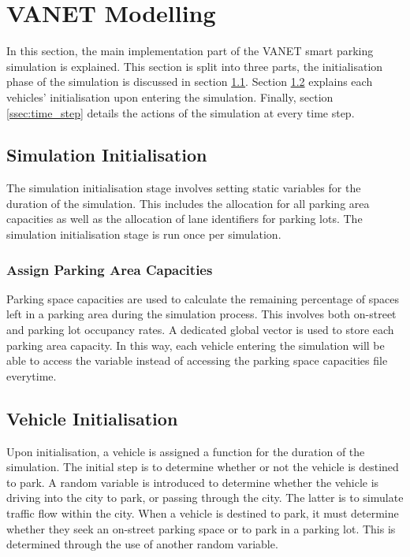 \section{\ac{VANET} Modelling}
In this section, the main implementation part of the \ac{VANET} smart parking simulation is explained. This section is split into three parts, the initialisation phase of the simulation is discussed in section \ref{ssec:sim_init}. Section \ref{ssec:vehicle_init} explains each vehicles' initialisation upon entering the simulation. Finally, section \ref{ssec:time_step} details the actions of the simulation at every time step.

\subsection{Simulation Initialisation} \label{ssec:sim_init}
The simulation initialisation stage involves setting static variables for the duration of the simulation. This includes the allocation for all parking area capacities as well as the allocation of lane identifiers for parking lots. The simulation initialisation stage is run once per simulation.

\subsubsection{Assign Parking Area Capacities}
Parking space capacities are used to calculate the remaining percentage of spaces left in a parking area during the simulation process. This involves both on-street and parking lot occupancy rates. A dedicated global vector is used to store each parking area capacity. In this way, each vehicle entering the simulation will be able to access the variable instead of accessing the parking space capacities file everytime.

\subsection{Vehicle Initialisation} \label{ssec:vehicle_init}
Upon initialisation, a vehicle is assigned a function for the duration of the simulation. The initial step is to determine whether or not the vehicle is destined to park. A random variable is introduced to determine whether the vehicle is driving into the city to park, or passing through the city. The latter is to simulate traffic flow within the city. When a vehicle is destined to park, it must determine whether they seek an on-street parking space or to park in a parking lot. This is determined through the use of another random variable.


